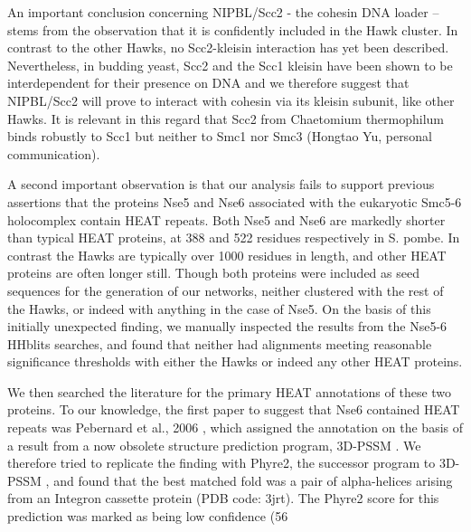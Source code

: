 \documentclass[a4paper,11pt,twoside,openright]{scrbook}
\let\cite\supercite
\begin{document}
An important conclusion concerning NIPBL/Scc2 - the cohesin DNA loader – stems from the observation that it is confidently included in the Hawk cluster. In contrast to the other Hawks, no Scc2-kleisin interaction has yet been described. Nevertheless, in budding yeast, Scc2 and the Scc1 kleisin have been shown to be interdependent for their presence on DNA \cite{Fernius2013} and we therefore suggest that NIPBL/Scc2 will prove to interact with cohesin via its kleisin subunit, like other Hawks. It is relevant in this regard that Scc2 from Chaetomium thermophilum binds robustly to Scc1 but neither to Smc1 nor Smc3 (Hongtao Yu, personal communication).

A second important observation is that our analysis fails to support previous assertions that the proteins Nse5 and Nse6 associated with the eukaryotic Smc5-6 holocomplex contain HEAT repeats. Both Nse5 and Nse6 are markedly shorter than typical HEAT proteins, at 388 and 522 residues respectively in S. pombe. In contrast the Hawks are typically over 1000 residues in length, and other HEAT proteins are often longer still. Though both proteins were included as seed sequences for the generation of our networks, neither clustered with the rest of the Hawks, or indeed with anything in the case of Nse5. On the basis of this initially unexpected finding, we manually inspected the results from the Nse5-6 HHblits searches, and found that neither had alignments meeting reasonable significance thresholds with either the Hawks or indeed any other HEAT proteins.

We then searched the literature for the primary HEAT annotations of these two proteins. To our knowledge, the first paper to suggest that Nse6 contained HEAT repeats was Pebernard et al., 2006 \cite{Pebernard2006}, which assigned the annotation on the basis of a result from a now obsolete structure prediction program, 3D-PSSM \cite{Kelley2000}. We therefore tried to replicate the finding with Phyre2, the successor program to 3D-PSSM \cite{Kelley2015}, and found that the best matched fold was a pair of alpha-helices arising from an Integron cassette protein (PDB code: 3jrt). The Phyre2 score for this prediction was marked as being low confidence (56%
\end{document}
